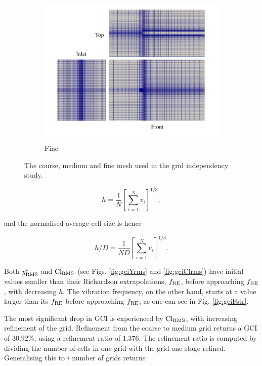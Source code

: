 \documentclass[oneside]{utmthesis}
\begin{document}
\begin{figure} \continuedfloat
  \centering
  \begin{subfigure}[h]{0.85\textwidth}
    \includegraphics[width=\textwidth]{figs/figure6c}
    \caption{Fine}
    \label{fig:fineMesh}
  \end{subfigure}

  \caption{The course, medium and fine mesh used in the grid independency study.} \label{fig:convergenceStudy}
\end{figure}

\begin{equation}
  h = \frac{1}{N} \left [ \sum_{i=1}^{N} v_{i} \right ]^{1/3},
  \label{eq:averageCellSize}
\end{equation}

\noindent and the normalised average cell size is hence 

\begin{equation}
  h/D = \frac{1}{ND} \left [ \sum_{i=1}^{N} v_{i} \right ]^{1/3}.
  \label{eq:normAveCellSize}
\end{equation}

\noindent Both $y^{*}_{\text{RMS}}$ and $\text{Cl}_{\text{RMS}}$ (see Figs. \ref{fig:gciYrms} and \ref{fig:gciClrms}) have initial values smaller than their Richardson extrapolations, $f_{\text{RE}}$, before approaching $f_{\text{RE}}$, with decreasing $h$. The vibration frequency, on the other hand, starts at a value larger than its $f_{\text{RE}}$ before approaching $f_{\text{RE}}$, as one can see in Fig. \ref{fig:gciFstr}.

The most significant drop in GCI is experienced by $\text{Cl}_{\text{RMS}}$, with increasing refinement of the grid. Refinement from the coarse to medium grid returns a GCI of $30.92\%$, using a refinement ratio of $1.376$. The refinement ratio is computed by dividing the number of cells in one grid with the grid one stage refined. Generalising this to $i$ number of grids returns
\end{document}
